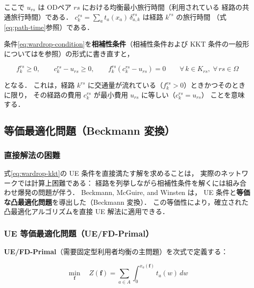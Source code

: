 ここで $u_{rs}$ は ODペア $rs$ における均衡最小旅行時間（利用されている
経路の共通旅行時間）である．
$c_k^{rs} = \sum_{a} t_a(x_a)\,\delta_{a,k}^{rs}$ は経路 $k^{rs}$ の旅行時間
（式\eqref{eq:path-time}参照）である．

条件\eqref{eq:wardrop-condition}を\textbf{相補性条件}（相補性条件および KKT 条件の一般形についてはを参照）の形式に書き直すと，

\begin{equation}
  f_k^{rs} \geq 0,
  \qquad
  c_k^{rs} - u_{rs} \geq 0,
  \qquad
  f_k^{rs}(c_k^{rs} - u_{rs}) = 0
  \qquad
  \forall\, k \in K_{rs},\; \forall\, rs \in \Omega
  \label{eq:wardrop-kkt}
\end{equation}

となる．
これは，経路 $k^{rs}$ に交通量が流れている（$f_k^{rs}>0$）ときかつそのときに限り，
その経路の費用 $c_k^{rs}$ が最小費用 $u_{rs}$ に等しい（$c_k^{rs}=u_{rs}$）
ことを意味する．

\subsection{等価最適化問題（Beckmann 変換）}
\label{subsec:beckmann}

\subsubsection*{直接解法の困難}

式\eqref{eq:wardrop-kkt}の UE 条件を直接満たす解を求めることは，
実際のネットワークでは計算上困難である：
経路を列挙しながら相補性条件を解くには組み合わせ爆発の問題が伴う．
Beckmann, McGuire, and Winsten \cite{Beckmann1956}は，
UE 条件と\textbf{等価な凸最適化問題}を導出した（Beckmann 変換）．
この等価性により，確立された凸最適化アルゴリズムを直接 UE 解法に適用できる．

\subsubsection*{UE 等価最適化問題（UE/FD-Primal）}

\textbf{UE/FD-Primal}（需要固定型利用者均衡の主問題）を次式で定義する：

\begin{equation}
  \min_{\boldsymbol{f}} \quad
  Z(\boldsymbol{f}) = \sum_{a \in A} \int_0^{x_a(\boldsymbol{f})} t_a(w)\, dw
  \label{eq:ue-primal}
\end{equation}

